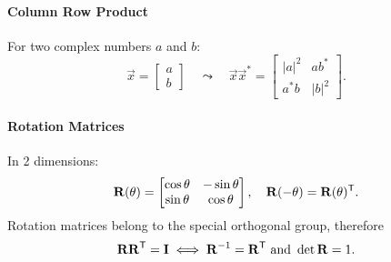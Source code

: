 \paragraph{Column Row Product}

For two complex numbers \(a\) and \(b\):
\[
	\vec{x} =
	\begin{bmatrix}
		a \\ b
	\end{bmatrix}
	\quad
	\leadsto
	\quad
	\vec{x} \vec{x}^* =
	\begin{bmatrix}
		|a|^2 & a b^* \\
		a^* b & |b|^2
	\end{bmatrix}.
\]

\paragraph{Rotation Matrices}

In 2 dimensions:
\[
	\bm{\mathrm{R}}(\theta) =
	\begin{bmatrix}
		\cos \theta & -\sin \theta \\
		\sin \theta & \cos \theta
	\end{bmatrix},
	\quad
	\bm{\mathrm{R}}(-\theta)
	= \bm{\mathrm{R}}(\theta)^\mathsf{T}
	.
\]
Rotation matrices belong to the special orthogonal group, therefore
\[
	\bm{\mathrm{R}}\bm{\mathrm{R}}^\mathsf{T} = \bm{\mathrm{I}}
	\iff
	\bm{\mathrm{R}}^{-1} = \bm{\mathrm{R}}^\mathsf{T}
	\text{ and }
	\det \bm{\mathrm{R}} = 1.
\]
